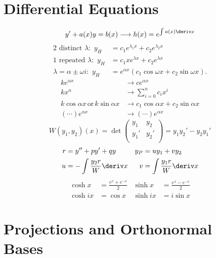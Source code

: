 \documentclass[10pt, a4paper]{article}
\begin{document}
\begin{landscape}
\begin{multicols}{3}

    \section{Differential Equations}

    \[y' + a(x) y = b(x) \longrightarrow h(x) = e^{\int a(x) \deriv x}\]
    \begin{align*}
        \text{2 distinct \(\lambda\):} \enspace y_{H} &= c_1 e^{\lambda_{1} x} + c_2 e^{\lambda_{2} x} \\
        \text{1 repeated \(\lambda\):} \enspace y_{H} &= c_1 x e^{\lambda x} + c_2 e ^{\lambda x} \\
        \lambda = \alpha \pm \omega i\text{:} \enspace y_{H} &= e^{\alpha x} \left(c_1 \cos \omega x + c_2 \sin \omega x\right).
    \end{align*}
    \begin{align*}
        k e^{\alpha x} &\longrightarrow ce^{\alpha x} \\
        k x^{n} &\longrightarrow \sum_{i=0}^{n} c_{i} x^{i} \\
        k \cos \alpha x \,\text{or}\, k \sin \alpha x &\longrightarrow c_1 \cos \alpha x + c_2 \sin \alpha x \\
        \left(\cdots\right) e^{\alpha x} &\longrightarrow \left(\cdots\right) e^{\alpha x}
    \end{align*}
    \[W(y_1, y_2)(x) = \det \begin{pmatrix}
        y_1 & y_2 \\ 
        y_1' & y_2' \\ 
    \end{pmatrix} = y_1 y_2' - y_2 y_1'\]
    \begin{align*}
        r &= y'' + py' + qy & y_{P} &= uy_1 + vy_2 \\
        u &= - \int \frac{y_2 r}{W} \deriv x & v &= \int \frac{y_1 r}{W} \deriv x
    \end{align*}
    \begin{align*}
        \cosh x &= \frac{e^x + e^{-x}}{2} & \sinh x &= \frac{e^x - e^{-x}}{2} \\
        \cosh ix &= \cos x & \sinh ix &= i \sin x
    \end{align*}

    \section{Projections and Orthonormal Bases}


\end{multicols}
\end{landscape}
\end{document}
